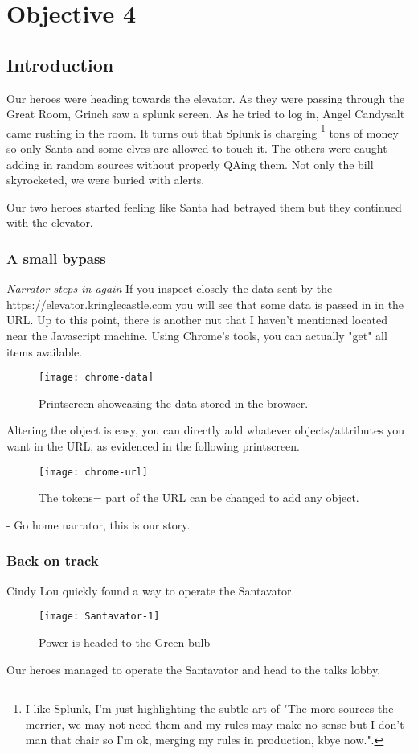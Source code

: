 \chapter{Objective 4}

\section{Introduction}

Our heroes were heading towards the elevator. As they were passing through the Great Room, Grinch saw a splunk screen.
As he tried to log in, {\color{codegreen}Angel Candysalt} came rushing in the room. It turns out that Splunk is charging \footnote{I like Splunk, I'm just highlighting the subtle art of "The more sources the merrier, we may not need them and my rules may make no sense but I don't man that chair so I'm ok, merging my rules in production, kbye now.".} tons of money so only Santa and some elves are allowed to touch it.
The others were caught adding in random sources without properly QAing them. Not only the bill skyrocketed, we were buried with alerts.

Our two heroes started feeling like Santa had betrayed them but they continued with the elevator.
\subsection{A small bypass}
\textit{Narrator steps in again} If you inspect closely the data sent by the https://elevator.kringlecastle.com you will see that some data is passed in in the URL.
Up to this point, there is another nut that I haven't mentioned located near the Javascript machine. Using Chrome's tools, you can actually "get" all items available.

\begin{figure}[h!]
  \texttt{[image: chrome-data]}
  \caption{Printscreen showcasing the data stored in the browser.}
\end{figure}

Altering the object is easy, you can directly add whatever objects/attributes you want in the URL, as evidenced in the following printscreen.
\newpage
\begin{figure}[h!]
  \texttt{[image: chrome-url]}
  \caption{The tokens= part of the URL can be changed to add any object.}
\end{figure}

- Go home narrator, this is our story.

\subsection {Back on track}
Cindy Lou quickly found a way to operate the Santavator.
\begin{figure}[h!]
  \texttt{[image: Santavator-1]}
  \caption{Power is headed to the Green bulb}
\end{figure}

Our heroes managed to operate the Santavator and head to the talks lobby.
